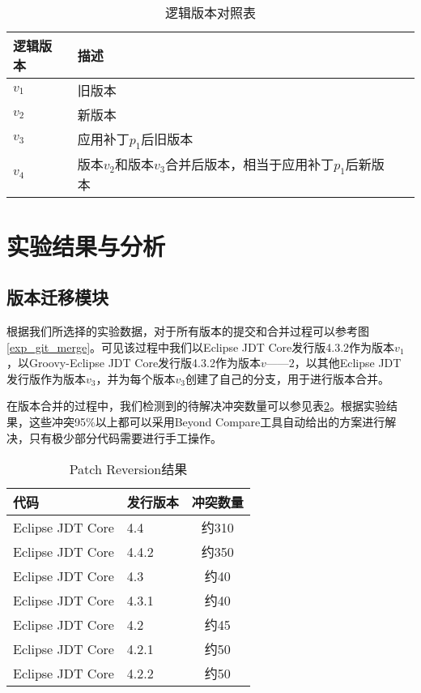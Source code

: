 \begin{table}
	\caption{逻辑版本对照表}
	\label{exp_version}
	\centering
	\begin{tabular}{llc}
		\toprule[1.5pt]
		{\heiti 逻辑版本} & {\heiti 描述} \\\midrule[1pt]
		$v_1$ & 旧版本 \\
		$v_2$ & 新版本\\
		$v_3$ & 应用补丁$p_1$后旧版本\\
		$v_4$ & 版本$v_2$和版本$v_3$合并后版本，相当于应用补丁$p_1$后新版本\\
		\bottomrule[1.5pt]
	\end{tabular}
\end{table}

\section{实验结果与分析}
\subsection{版本迁移模块}

根据我们所选择的实验数据，对于所有版本的提交和合并过程可以参考图\ref {exp_git_merge}。可见该过程中我们以Eclipse JDT Core发行版4.3.2作为版本$v_1$，以Groovy-Eclipse JDT Core发行版4.3.2作为版本$v——2$，以其他Eclipse JDT 发行版作为版本$v_3$，并为每个版本$v_3$创建了自己的分支，用于进行版本合并。


在版本合并的过程中，我们检测到的待解决冲突数量可以参见表\ref {data_git_merge}。根据实验结果，这些冲突95\%以上都可以采用Beyond Compare工具自动给出的方案进行解决，只有极少部分代码需要进行手工操作。

\begin{table}
	\caption{Patch Reversion结果}
	\label{data_git_merge}
	\centering
	\begin{tabular}{llc}
		\toprule[1.5pt]
		{\heiti 代码} & {\heiti 发行版本} & {\heiti 冲突数量} \\\midrule[1pt]
		Eclipse JDT Core & 4.4 & 约310\\
		Eclipse JDT Core & 4.4.2 & 约350\\
		Eclipse JDT Core & 4.3 & 约40\\
		Eclipse JDT Core & 4.3.1 & 约40\\
		Eclipse JDT Core & 4.2 & 约45\\
		Eclipse JDT Core & 4.2.1 & 约50\\
		Eclipse JDT Core & 4.2.2 & 约50\\
		\bottomrule[1.5pt]
	\end{tabular}
\end{table}


